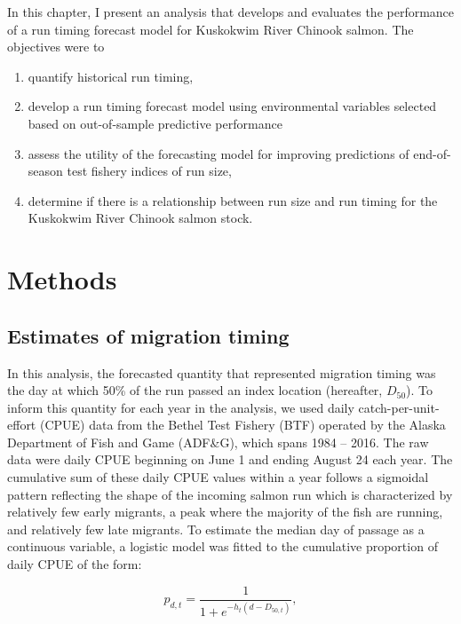 \documentclass[12pt,]{book}
\providecommand{\tightlist}{%
  \setlength{\itemsep}{0pt}\setlength{\parskip}{0pt}}
\theoremstyle{definition}
\theoremstyle{definition}
\theoremstyle{definition}
\theoremstyle{remark}
\begin{document}
In this chapter, I present an analysis that develops and evaluates the
performance of a run timing forecast model for Kuskokwim River Chinook
salmon. The objectives were to

\begin{enumerate}
\def\labelenumi{(\arabic{enumi})}
\tightlist
\item
  quantify historical run timing,
\item
  develop a run timing forecast model using environmental variables
  selected based on out-of-sample predictive performance
\item
  assess the utility of the forecasting model for improving predictions
  of end-of-season test fishery indices of run size,
\item
  determine if there is a relationship between run size and run timing
  for the Kuskokwim River Chinook salmon stock.
\end{enumerate}

\section{Methods}\label{methods}

\subsection{Estimates of migration
timing}\label{estimates-of-migration-timing}

\noindent
In this analysis, the forecasted quantity that represented migration
timing was the day at which 50\% of the run passed an index location
(hereafter, \(D_{50}\)). To inform this quantity for each year in the
analysis, we used daily catch-per-unit-effort (CPUE) data from the
Bethel Test Fishery (BTF) operated by the Alaska Department of Fish and
Game (ADF\&G), which spans 1984 -- 2016. The raw data were daily CPUE
beginning on June 1 and ending August 24 each year. The cumulative sum
of these daily CPUE values within a year follows a sigmoidal pattern
reflecting the shape of the incoming salmon run which is characterized
by relatively few early migrants, a peak where the majority of the fish
are running, and relatively few late migrants. To estimate the median
day of passage as a continuous variable, a logistic model was fitted to
the cumulative proportion of daily CPUE of the form:

\begin{equation}
  p_{d,t}=\frac{1}{1 + e^{-h_t (d - D_{50,t})}},
  \label{eq:logistic}
\end{equation}
\end{document}
